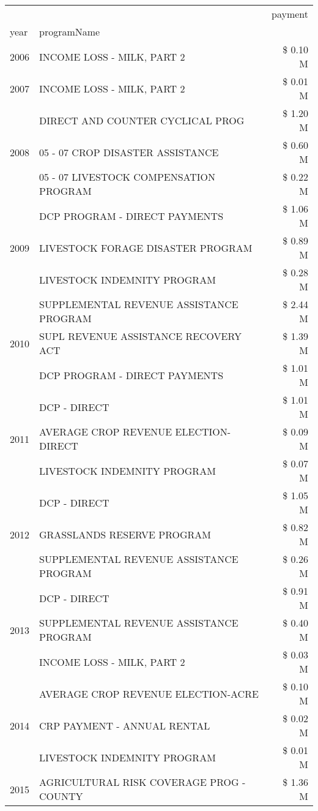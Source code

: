 \begin{tabular}{llr}
\toprule
 &  & payment \\
year & programName &  \\
\midrule
2006 & INCOME LOSS - MILK, PART 2 & \$ 0.10 M \\
\cline{1-3}
2007 & INCOME LOSS - MILK, PART 2 & \$ 0.01 M \\
\cline{1-3}
\multirow[t]{3}{*}{2008} & DIRECT AND COUNTER CYCLICAL PROG & \$ 1.20 M \\
 & 05 - 07 CROP DISASTER ASSISTANCE & \$ 0.60 M \\
 & 05 - 07 LIVESTOCK COMPENSATION PROGRAM & \$ 0.22 M \\
\cline{1-3}
\multirow[t]{3}{*}{2009} & DCP PROGRAM - DIRECT PAYMENTS & \$ 1.06 M \\
 & LIVESTOCK FORAGE DISASTER  PROGRAM & \$ 0.89 M \\
 & LIVESTOCK INDEMNITY PROGRAM & \$ 0.28 M \\
\cline{1-3}
\multirow[t]{3}{*}{2010} & SUPPLEMENTAL REVENUE ASSISTANCE PROGRAM & \$ 2.44 M \\
 & SUPL REVENUE ASSISTANCE RECOVERY ACT & \$ 1.39 M \\
 & DCP PROGRAM - DIRECT PAYMENTS & \$ 1.01 M \\
\cline{1-3}
\multirow[t]{3}{*}{2011} & DCP - DIRECT & \$ 1.01 M \\
 & AVERAGE CROP REVENUE ELECTION-DIRECT & \$ 0.09 M \\
 & LIVESTOCK INDEMNITY PROGRAM & \$ 0.07 M \\
\cline{1-3}
\multirow[t]{3}{*}{2012} & DCP - DIRECT & \$ 1.05 M \\
 & GRASSLANDS RESERVE PROGRAM & \$ 0.82 M \\
 & SUPPLEMENTAL REVENUE ASSISTANCE PROGRAM & \$ 0.26 M \\
\cline{1-3}
\multirow[t]{3}{*}{2013} & DCP - DIRECT & \$ 0.91 M \\
 & SUPPLEMENTAL REVENUE ASSISTANCE PROGRAM & \$ 0.40 M \\
 & INCOME LOSS - MILK, PART 2 & \$ 0.03 M \\
\cline{1-3}
\multirow[t]{3}{*}{2014} & AVERAGE CROP REVENUE ELECTION-ACRE & \$ 0.10 M \\
 & CRP PAYMENT - ANNUAL RENTAL & \$ 0.02 M \\
 & LIVESTOCK INDEMNITY PROGRAM & \$ 0.01 M \\
\cline{1-3}
\multirow[t]{3}{*}{2015} & AGRICULTURAL RISK COVERAGE PROG - COUNTY & \$ 1.36 M \\

\end{tabular}
